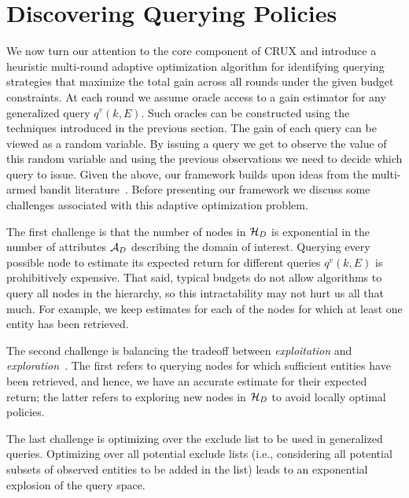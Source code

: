 

\section{Discovering Querying Policies}
\label{sec:solving}
We now turn our attention to the core component of CRUX and introduce a heuristic multi-round adaptive optimization algorithm for identifying querying strategies that maximize the total gain across all rounds under the given budget constraints. At each round we assume oracle access to a gain estimator for any generalized query $q^v(k,E)$. Such oracles can be constructed using the techniques introduced in the previous section. The gain of each query can be viewed as a random variable. By issuing a query we get to observe the value of this random variable and using the previous observations we need to decide which query to issue. Given the above, our framework builds upon ideas from the multi-armed bandit literature~\cite{Auer:2003,EvenDar06actionelimination}. Before presenting our framework we discuss some challenges associated with this adaptive optimization problem.

\squishlist
\item The first challenge is that the number of nodes in $\mathcal{H}_D$ is exponential in the number of attributes $\mathcal{A}_D$ describing the domain of interest. Querying every possible node to estimate its expected return for different queries $q^v(k,E)$ is prohibitively expensive. That said, typical budgets do not allow algorithms to query all nodes in the hierarchy, so this intractability may not hurt us all that much. For example, we keep estimates for each of the nodes for which at least one entity has been retrieved.
\item The second challenge is balancing the tradeoff between {\em exploitation} and {\em exploration}~\cite{Auer:2003}. The first refers to querying nodes for which sufficient entities have been retrieved, and hence, we have an accurate estimate for their expected return; the latter refers to exploring new nodes in $\mathcal{H}_D$ to avoid locally optimal policies.
\item The last challenge is optimizing over the exclude list to be used in generalized queries. Optimizing over all potential exclude lists (i.e., considering all potential subsets of observed entities to be added in the list) leads to an exponential explosion of the query space.
\squishend

